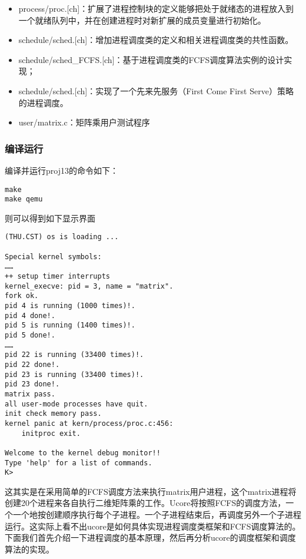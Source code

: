 \begin{itemize}
\tightlist
\item
  process/proc.{[}ch{]}：扩展了进程控制块的定义能够把处于就绪态的进程放入到一个就绪队列中，并在创建进程时对新扩展的成员变量进行初始化。
\item
  schedule/sched.{[}ch{]}：增加进程调度类的定义和相关进程调度类的共性函数。
\item
  schedule/sched\_FCFS.{[}ch{]}：基于进程调度类的FCFS调度算法实例的设计实现；
\item
  schedule/sched.{[}ch{]}：实现了一个先来先服务（First Come First
  Serve）策略的进程调度。
\item
  user/matrix.c：矩阵乘用户测试程序
\end{itemize}

\subsubsection{编译运行}\label{ux7f16ux8bd1ux8fd0ux884c}

编译并运行proj13的命令如下：

\begin{lstlisting}
make
make qemu
\end{lstlisting}

则可以得到如下显示界面

\begin{lstlisting}
(THU.CST) os is loading ...

Special kernel symbols:
……
++ setup timer interrupts
kernel_execve: pid = 3, name = "matrix".
fork ok.
pid 4 is running (1000 times)!.
pid 4 done!.
pid 5 is running (1400 times)!.
pid 5 done!.
……
pid 22 is running (33400 times)!.
pid 22 done!.
pid 23 is running (33400 times)!.
pid 23 done!.
matrix pass.
all user-mode processes have quit.
init check memory pass.
kernel panic at kern/process/proc.c:456:
    initproc exit.

Welcome to the kernel debug monitor!!
Type 'help' for a list of commands.
K>
\end{lstlisting}

这其实是在采用简单的FCFS调度方法来执行matrix用户进程，这个matrix进程将创建20个进程来各自执行二维矩阵乘的工作。Ucore将按照FCFS的调度方法，一个一个地按创建顺序执行每个子进程。一个子进程结束后，再调度另外一个子进程运行。这实际上看不出ucore是如何具体实现进程调度类框架和FCFS调度算法的。下面我们首先介绍一下进程调度的基本原理，然后再分析ucore的调度框架和调度算法的实现。
